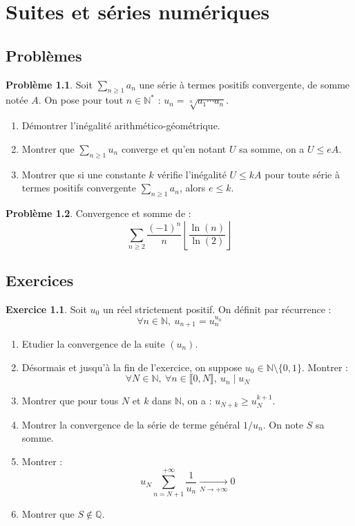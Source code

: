 \documentclass[french]{book}
\newcommand{\N}{\mathbb{N}}
\newcommand{\Q}{\mathbb{Q}}
\newcommand{\st}{^*}
\theoremstyle{definition}
\newtheorem{ex}{Exercice}[chapter]
\newtheorem{pro}{Problème}[chapter]
\theoremstyle{remark}
\begin{document}
\chapter{Suites et séries numériques}

\section{Problèmes}

\begin{pro}
	Soit $\displaystyle\sum_{n\geqslant 1}a_n$ une série à termes positifs convergente, de somme notée $A$. On pose pour tout $n\in\N\st$ : $u_n=\sqrt[n]{a_1\cdots a_n}$.
	\begin{enumerate}
		\item Démontrer l'inégalité arithmético-géométrique.
		\item Montrer que $\displaystyle\sum_{n\geqslant 1}u_n$ converge et qu'en notant $U$ sa somme, on a $U\leqslant e A$.
		\item Montrer que si une constante $k$ vérifie l'inégalité $U\leqslant k A$ pour toute série à termes positifs convergente $\displaystyle\sum_{n\geqslant 1}a_n$, alors $e\leqslant k$.
	\end{enumerate}
\end{pro}

\begin{pro}
	Convergence et somme de : $$\sum_{n\geqslant 2}\frac{(-1)^n}{n}\left\lfloor\frac{\ln(n)}{\ln(2)}\right\rfloor$$
\end{pro}

\section{Exercices}

\begin{ex}
	Soit $u_0$ un réel strictement positif. On définit par récurrence : $$\forall n\in\N,\ u_{n+1}=u_n^{u_n}$$
	\begin{enumerate}
		\item Etudier la convergence de la suite $(u_n)$.
		\item Désormais et jusqu'à la fin de l'exercice, on suppose $u_0\in\N\setminus\{0,1\}$. Montrer : $$\forall N\in\N,\ \forall n\in\llbracket0,N\rrbracket,\ u_n\mid u_N$$
		\item Montrer que pour tous $N$ et $k$ dans $\N$, on a : $u_{N+k}\geqslant u_N^{k+1}$.
		\item Montrer la convergence de la série de terme général $1/u_n$. On note $S$ sa somme.
		\item Montrer : $$u_N\sum_{n=N+1}^{+\infty}\frac{1}{u_n}\xrightarrow[N\to+\infty]{}0$$
		\item Montrer que $S\notin\Q$.
	\end{enumerate}
\end{ex}
\end{document}
